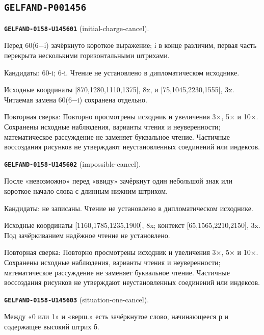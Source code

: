 \subsection*{\texttt{GELFAND-P001456}}
\par\noindent\leavevmode{}\label{GELFAND-0158-U145601}\label{GELFAND-P001456:initial-charge-cancel}\textbf{\texttt{GELFAND-0158-U145601}} (initial-charge-cancel).\nopagebreak[4]\par
Перед 60(6−i) зачёркнуто короткое выражение; i в конце различим, первая часть перекрыта несколькими горизонтальными штрихами.\par
Кандидаты: 60-i; 6-i. Чтение не установлено в дипломатическом исходнике.\par
Исходные координаты [870,1280,1110,1375], 8x, и [75,1045,2230,1555], 3x. Читаемая замена 60(6−i) сохранена отдельно.\par
Повторная сверка: Повторно просмотрены исходник и увеличения 3×, 5× и 10×. Сохранены исходные наблюдения, варианты чтения и неуверенности; математическое рассуждение не заменяет буквальное чтение. Частичные воссоздания рисунков не утверждают неустановленных соединений или индексов.\par\medskip
\par\noindent\leavevmode{}\label{GELFAND-0158-U145602}\label{GELFAND-P001456:impossible-cancel}\textbf{\texttt{GELFAND-0158-U145602}} (impossible-cancel).\nopagebreak[4]\par
После «невозможно» перед «ввиду» зачёркнут один небольшой знак или короткое начало слова с длинным нижним штрихом.\par
Кандидаты: не записаны. Чтение не установлено в дипломатическом исходнике.\par
Исходные координаты [1160,1785,1235,1900], 8x; контекст [65,1565,2210,2150], 3x. Под зачёркиванием надёжное чтение не установлено.\par
Повторная сверка: Повторно просмотрены исходник и увеличения 3×, 5× и 10×. Сохранены исходные наблюдения, варианты чтения и неуверенности; математическое рассуждение не заменяет буквальное чтение. Частичные воссоздания рисунков не утверждают неустановленных соединений или индексов.\par\medskip
\par\noindent\leavevmode{}\label{GELFAND-0158-U145603}\label{GELFAND-P001456:situation-one-cancel}\textbf{\texttt{GELFAND-0158-U145603}} (situation-one-cancel).\nopagebreak[4]\par
Между «0 или 1» и «верш.» есть зачёркнутое слово, начинающееся р и содержащее высокий штрих б.\par
